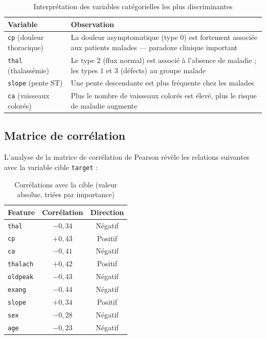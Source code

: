 \documentclass[12pt,a4paper]{article}
\newcommand{\feat}[1]{\texttt{\textcolor{medblue}{#1}}}
\begin{document}
		\begin{table}[H]
		\centering
		\caption{Interprétation des variables catégorielles les plus discriminantes}
		\label{tab:cat}
			\begin{tabularx}{\textwidth}{lX}
				\toprule
				\textbf{Variable} & \textbf{Observation} \\
				\midrule
				\feat{cp} (douleur thoracique) & La douleur asymptomatique (type 0) est fortement associée aux patients malades — paradoxe clinique important \\
				\feat{thal} (thalassémie) & Le type 2 (flux normal) est associé à l'absence de maladie ; les types 1 et 3 (défects) au groupe malade \\
				\feat{slope} (pente ST) & Une pente descendante est plus fréquente chez les malades \\
				\feat{ca} (vaisseaux colorés) & Plus le nombre de vaisseaux colorés est élevé, plus le risque de maladie augmente \\
				\bottomrule
			\end{tabularx}
		\end{table}
		\subsection{Matrice de corrélation}

		L'analyse de la matrice de corrélation de Pearson révèle les relations suivantes avec la variable cible \feat{target} :

		\begin{table}[H]
		\centering
		\caption{Corrélations avec la cible (valeur absolue, triées par importance)}
		\label{tab:corr}
		\begin{tabular}{lcc}
			\toprule
			\textbf{Feature} & \textbf{Corrélation} & \textbf{Direction} \\
			\midrule
			\feat{thal}     & $-0{,}34$ & Négatif \\
			\feat{cp}       & $+0{,}43$ & Positif \\
			\feat{ca}       & $-0{,}41$ & Négatif \\
			\feat{thalach}  & $+0{,}42$ & Positif \\
			\feat{oldpeak}  & $-0{,}43$ & Négatif \\
			\feat{exang}    & $-0{,}44$ & Négatif \\
			\feat{slope}    & $+0{,}34$ & Positif \\
			\feat{sex}      & $-0{,}28$ & Négatif \\
			\feat{age}      & $-0{,}23$ & Négatif \\
			\bottomrule
		\end{tabular}
		\end{table}
\end{document}
